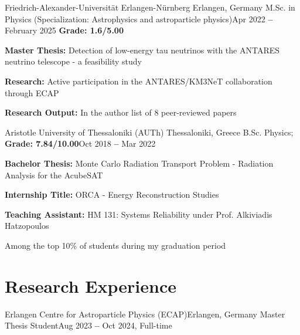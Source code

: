 \documentclass[letterpaper,11pt]{article}
\begin{document}
    \resumeEducationHeading
      {Friedrich-Alexander-Universität Erlangen-Nürnberg
      }{Erlangen, Germany}
      {M.Sc. in Physics (Specialization: Astrophysics and astroparticle physics)}{Apr 2022 \textbf{--} February 2025}
      {\textbf{Grade: 1.6/5.00}}{}
        \resumeSubHeadingListStart
        \small{\item{
             \textbf{Master Thesis:} Detection of low-energy tau neutrinos with the
                    ANTARES neutrino telescope - a feasibility study}}
        \small{\item{
             \textbf{Research:} Active participation in the ANTARES/KM3NeT collaboration through ECAP}}
        \small{\item{
             \textbf{Research Output:} In the author list of 8 peer-reviewed papers}}
        \resumeSubHeadingListEnd

    \resumeSubheading
    {Aristotle University of Thessaloniki (AUTh)
      }{Thessaloniki, Greece}
      {B.Sc. Physics;
      \textbf{Grade: 7.84/10.00}}{Oct 2018 \textbf{--} Mar 2022}
        \resumeSubHeadingListStart
        \small{\item{
             \textbf{Bachelor Thesis:} Monte Carlo Radiation Transport Problem - Radiation Analysis for the AcubeSAT}}
        \small{\item{
             \textbf{Internship Title:} ORCA - Energy Reconstruction Studies}}
        \small{\item{
             \textbf{Teaching Assistant:} HM 131: Systems Reliability under Prof. Alkiviadis Hatzopoulos}}
        \small{\item{
            Among the top 10\% of students during my graduation period}}  
        \resumeSubHeadingListEnd

      
  \resumeSubHeadingListEnd


\section{Research Experience}
  \vspace{3pt}
  \resumeSubHeadingListStart

    \resumeSubheading
      {Erlangen Centre for Astroparticle Physics (ECAP)}{Erlangen, Germany}
      {Master Thesis Student}{Aug 2023 \textbf{--} Oct 2024, Full-time}
        \resumeItemListStart
        \resumeItemListEnd
\end{document}
